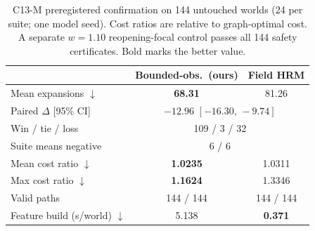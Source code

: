 \documentclass[letterpaper]{article} %
\newcommand{\stage}[1]{\textsc{#1}}
\begin{document}
\begin{table}[t]
\centering
\small
\begin{tabular}{lcc}
\toprule
 & Bounded-obs.\ (ours) & Field HRM \\
\midrule
Mean expansions $\downarrow$ & \textbf{68.31} & 81.26 \\
Paired $\Delta$ [95\% CI] & \multicolumn{2}{c}{$-12.96$ $[-16.30,\,-9.74]$} \\
Win / tie / loss & \multicolumn{2}{c}{109 / 3 / 32} \\
Suite means negative & \multicolumn{2}{c}{6 / 6} \\
Mean cost ratio $\downarrow$ & \textbf{1.0235} & 1.0311 \\
Max cost ratio $\downarrow$ & \textbf{1.1624} & 1.3346 \\
Valid paths & 144 / 144 & 144 / 144 \\
Feature build (s/world) $\downarrow$ & 5.138 & \textbf{0.371} \\
\bottomrule
\end{tabular}
\caption{\stage{C13-M} preregistered confirmation on 144 untouched worlds (24 per suite; one model seed). Cost ratios are relative to graph-optimal cost. A separate $w{=}1.10$ reopening-focal control passes all 144 safety certificates. Bold marks the better value.}
\label{tab:c13m}
\end{table}
\end{document}
